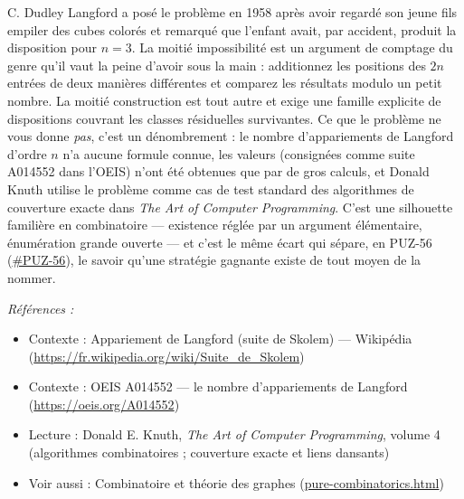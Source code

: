 \documentclass[11pt]{article}
\newenvironment{refs}{\par\small\noindent\emph{Références :}\begin{itemize}\setlength\itemsep{0pt}}{\end{itemize}\normalsize}
\begin{document}
\noindent C. Dudley Langford a posé le problème en 1958 après avoir regardé son
jeune fils empiler des cubes colorés et remarqué que l'enfant avait, par accident, produit la
disposition pour $ n = 3 $. La moitié \og{} impossibilité \fg{} est un argument de comptage du
genre qu'il vaut la peine d'avoir sous la main : additionnez les positions des $ 2n $
entrées de deux manières différentes et comparez les résultats modulo un petit nombre. La
moitié \og{} construction \fg{} est tout autre et exige une famille explicite de dispositions
couvrant les classes résiduelles survivantes. Ce que le problème ne vous donne \textit{pas},
c'est un dénombrement : le nombre d'appariements de Langford d'ordre $ n $ n'a aucune
formule connue, les valeurs (consignées comme suite A014552 dans l'OEIS) n'ont été obtenues
que par de gros calculs, et Donald Knuth utilise le problème comme cas de test standard des
algorithmes de couverture exacte dans \textit{The Art of Computer Programming}. C'est une
silhouette familière en combinatoire --- existence réglée par un argument élémentaire,
énumération grande ouverte --- et c'est le même écart qui sépare, en
PUZ-56 (\url{#PUZ-56}), le savoir qu'une stratégie gagnante existe de tout moyen de la
nommer.

\begin{refs}
\item Contexte : Appariement de Langford (suite de Skolem) --- Wikipédia (\url{https://fr.wikipedia.org/wiki/Suite_de_Skolem})
\item Contexte : OEIS A014552 --- le nombre d'appariements de Langford (\url{https://oeis.org/A014552})
\item Lecture : Donald E. Knuth, \textit{The Art of Computer Programming}, volume 4 (algorithmes combinatoires ; couverture exacte et liens dansants)
\item Voir aussi : Combinatoire et théorie des graphes (\url{pure-combinatorics.html})
\end{refs}

\bigskip
\end{document}
